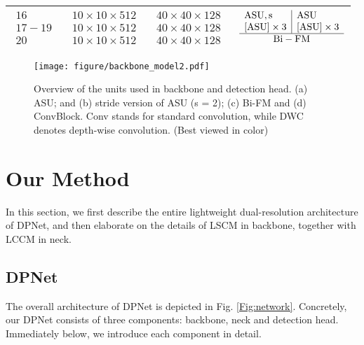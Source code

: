 \documentclass[lettersize,journal]{IEEEtran}
\begin{document}
\begin{table}
\begin{center}
{\begin{tabular}{l|c|c|c|c}
\midrule
$\begin{array}{l}16\\17-19 \\ 20 \end{array}$    &$\begin{array}{l}10\times10\times512\\10\times10\times512 \\  {10\times10\times512}  \end{array}$  &$\begin{array}{l}40\times40\times128\ \\{40\times40\times128} \\ {40\times40\times128}\end{array}$ &\multicolumn{2}{l}{$ \begin{array}{l|l} \mathrm{ASU,s}&  \mathrm{ASU} \\ \left[\mathrm{ASU}\right] \times 3 & \left[\mathrm{ASU}\right] \times 3  \\ \hline \multicolumn{2}{c}{\mathrm{Bi-FM}} \end{array} $}\\
\bottomrule
\end{tabular}}
\end{center}
\label{tab:DPNet}
\end{table}
\begin{figure*}[t!] 
\centering 
\texttt{[image: figure/backbone\_model2.pdf]} 
\caption{Overview of the units used in backbone and detection head. (a) ASU; and (b) stride version of ASU (s = 2); (c) Bi-FM and (d) ConvBlock. Conv stands for standard convolution, while DWC denotes depth-wise convolution. (Best viewed in color)} 
\label{Fig:Blocks} 
\end{figure*}


\section{Our Method}\label{sec:DPNet}

In this section, we first describe the entire lightweight dual-resolution architecture of DPNet, and then elaborate on the details of LSCM in backbone, together with LCCM in neck.

\subsection{DPNet}

The overall architecture of DPNet is depicted in Fig. \ref{Fig:network}. Concretely, our DPNet consists of three components: backbone, neck and detection head. Immediately below, we introduce each component in detail.
\end{document}

